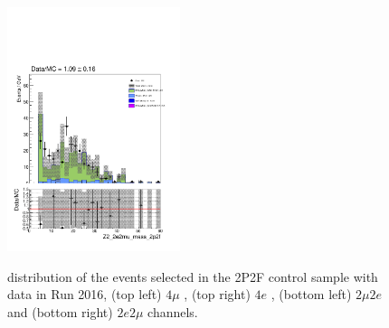 \begin{figure}[!htb]
\begin{center}
    {\includegraphics [width=0.45\textwidth] {Figures/RedBkg/2P2F/Z2_2e2mu_mass_2p2f.pdf}} \\
    \caption{
         distribution of the events selected in the 2P2F control sample with data in Run 2016, 
        (top left)  $4\mu$ , (top right) $4e$ , (bottom left)  $2\mu2e$ and (bottom right)  $2e2\mu$ channels.
    }
\label{fig:mZ2_2P2F_dataMC_16}
\end{center}
\end{figure}

